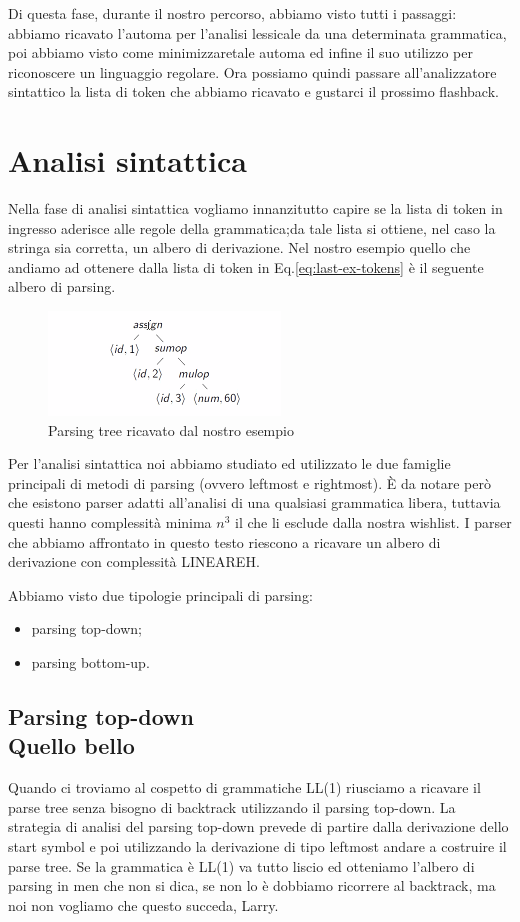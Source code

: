 \documentclass[class=book, crop=false, oneside, 12pt]{standalone}
\begin{document}
Di questa fase, durante il nostro percorso, abbiamo visto tutti i passaggi: abbiamo ricavato l'automa per l'analisi lessicale da una determinata grammatica, poi abbiamo visto come minimizzaretale automa ed infine il suo utilizzo per riconoscere un linguaggio regolare.
Ora possiamo quindi passare all'analizzatore sintattico la lista di token che abbiamo ricavato e gustarci il prossimo flashback. 

\section{Analisi sintattica}
Nella fase di analisi sintattica vogliamo innanzitutto capire se la lista di token in ingresso aderisce alle regole della grammatica;da tale lista si ottiene, nel caso la stringa sia corretta, un albero di derivazione.
Nel nostro esempio quello che andiamo ad ottenere dalla lista di token in Eq.\ref{eq:last-ex-tokens} è il seguente albero di parsing.
\begin{figure}[H]
    \centering
    \includegraphics[width=.4\textwidth]{final-example-parsing-tree.png}
    \caption{Parsing tree ricavato dal nostro esempio}
    \label{fig:last-ex-parse-tree}
\end{figure}
Per l'analisi sintattica noi abbiamo studiato ed utilizzato le due famiglie principali di metodi di parsing (ovvero leftmost e rightmost). 
È da notare però che esistono parser adatti all'analisi di una qualsiasi grammatica libera, tuttavia questi hanno complessità minima \(n^3\) il che li esclude dalla nostra wishlist.
I parser che abbiamo affrontato in questo testo riescono a ricavare un albero di derivazione con complessità LINEAREH.

Abbiamo visto due tipologie principali di parsing:
\begin{itemize}
    \item parsing top-down;
    \item parsing bottom-up.
\end{itemize} 

\subsection{Parsing top-down\\ \small{Quello bello}}
Quando ci troviamo al cospetto di grammatiche LL(1) riusciamo a ricavare il parse tree senza bisogno di backtrack utilizzando il parsing top-down.
La strategia di analisi del parsing top-down prevede di partire dalla derivazione dello start symbol e poi utilizzando la derivazione di tipo leftmost andare a costruire il parse tree.
Se la grammatica è LL(1) va tutto liscio ed otteniamo l'albero di parsing in men che non si dica, se non lo è dobbiamo ricorrere al backtrack, ma noi non vogliamo che questo succeda, Larry.
\end{document}

